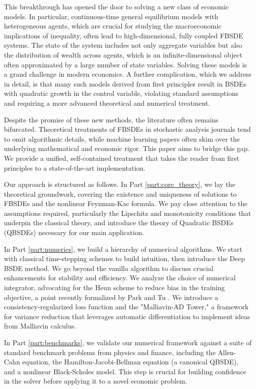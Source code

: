 This breakthrough has opened the door to solving a new class of economic models. In particular, continuous-time general equilibrium models with heterogeneous agents, which are crucial for studying the macroeconomic implications of inequality, often lead to high-dimensional, fully coupled FBSDE systems. The state of the system includes not only aggregate variables but also the distribution of wealth across agents, which is an infinite-dimensional object often approximated by a large number of state variables. Solving these models is a grand challenge in modern economics. A further complication, which we address in detail, is that many such models derived from first principles result in BSDEs with quadratic growth in the control variable, violating standard assumptions and requiring a more advanced theoretical and numerical treatment.

Despite the promise of these new methods, the literature often remains bifurcated. Theoretical treatments of FBSDEs in stochastic analysis journals tend to omit algorithmic details, while machine learning papers often skim over the underlying mathematical and economic rigor. This paper aims to bridge this gap. We provide a unified, self-contained treatment that takes the reader from first principles to a state-of-the-art implementation.

Our approach is structured as follows. In Part \ref{part:core_theory}, we lay the theoretical groundwork, covering the existence and uniqueness of solutions to FBSDEs and the nonlinear Feynman-Kac formula. We pay close attention to the assumptions required, particularly the Lipschitz and monotonicity conditions that underpin the classical theory, and introduce the theory of Quadratic BSDEs (QBSDEs) necessary for our main application.

In Part \ref{part:numerics}, we build a hierarchy of numerical algorithms. We start with classical time-stepping schemes to build intuition, then introduce the Deep BSDE method. We go beyond the vanilla algorithm to discuss crucial enhancements for stability and efficiency. We analyze the choice of numerical integrator, advocating for the Heun scheme to reduce bias in the training objective, a point recently formalized by Park and Tu \cite{ParkTu2025}. We introduce a consistency-regularized loss function and the "Malliavin-AD Tower," a framework for variance reduction that leverages automatic differentiation to implement ideas from Malliavin calculus.

In Part \ref{part:benchmarks}, we validate our numerical framework against a suite of standard benchmark problems from physics and finance, including the Allen-Cahn equation, the Hamilton-Jacobi-Bellman equation (a canonical QBSDE), and a nonlinear Black-Scholes model. This step is crucial for building confidence in the solver before applying it to a novel economic problem.

